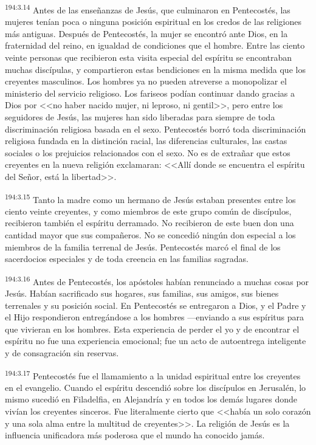 \par 
\textsuperscript{194:3.14} Antes de las enseñanzas de Jesús, que culminaron en Pentecostés, las mujeres tenían poca o ninguna posición espiritual en los credos de las religiones más antiguas. Después de Pentecostés, la mujer se encontró ante Dios, en la fraternidad del reino, en igualdad de condiciones que el hombre. Entre las ciento veinte personas que recibieron esta visita especial del espíritu se encontraban muchas discípulas, y compartieron estas bendiciones en la misma medida que los creyentes masculinos. Los hombres ya no pueden atreverse a monopolizar el ministerio del servicio religioso. Los fariseos podían continuar dando gracias a Dios por <<no haber nacido mujer, ni leproso, ni gentil>>, pero entre los seguidores de Jesús, las mujeres han sido liberadas para siempre de toda discriminación religiosa basada en el sexo. Pentecostés borró toda discriminación religiosa fundada en la distinción racial, las diferencias culturales, las castas sociales o los prejuicios relacionados con el sexo. No es de extrañar que estos creyentes en la nueva religión exclamaran: <<Allí donde se encuentra el espíritu del Señor, está la libertad>>.

\par 
\textsuperscript{194:3.15} Tanto la madre como un hermano de Jesús estaban presentes entre los ciento veinte creyentes, y como miembros de este grupo común de discípulos, recibieron también el espíritu derramado. No recibieron de este buen don una cantidad mayor que sus compañeros. No se concedió ningún don especial a los miembros de la familia terrenal de Jesús. Pentecostés marcó el final de los sacerdocios especiales y de toda creencia en las familias sagradas.

\par 
\textsuperscript{194:3.16} Antes de Pentecostés, los apóstoles habían renunciado a muchas cosas por Jesús. Habían sacrificado sus hogares, sus familias, sus amigos, sus bienes terrenales y su posición social. En Pentecostés se entregaron a Dios, y el Padre y el Hijo respondieron entregándose a los hombres ---enviando a sus espíritus para que vivieran en los hombres. Esta experiencia de perder el yo y de encontrar el espíritu no fue una experiencia emocional; fue un acto de autoentrega inteligente y de consagración sin reservas.

\par 
\textsuperscript{194:3.17} Pentecostés fue el llamamiento a la unidad espiritual entre los creyentes en el evangelio. Cuando el espíritu descendió sobre los discípulos en Jerusalén, lo mismo sucedió en Filadelfia, en Alejandría y en todos los demás lugares donde vivían los creyentes sinceros. Fue literalmente cierto que <<había un solo corazón y una sola alma entre la multitud de creyentes>>. La religión de Jesús es la influencia unificadora más poderosa que el mundo ha conocido jamás.

